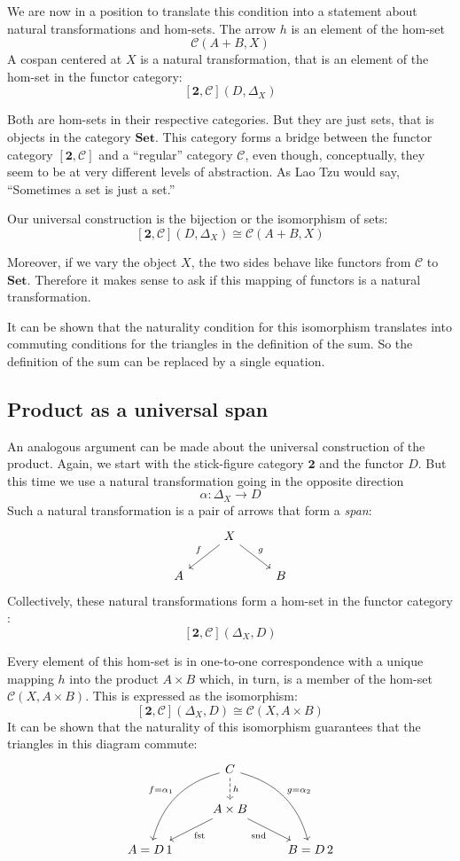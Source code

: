 \documentclass[DaoFP]{subfiles}
\begin{document}
We are now in a position to translate this condition into a statement about natural transformations and hom-sets. The arrow $h$ is an element of the hom-set 
\[ \mathcal{C}(A + B, X)\]
A cospan centered at $X$ is a natural transformation, that is an element of the hom-set in the functor category:
\[ [\mathbf{2}, \mathcal{C}](D, \Delta_X) \]

Both are hom-sets in their respective categories. But they are just sets, that is objects in the category $\mathbf{Set}$. This category forms a bridge between the functor category $[\mathbf{2}, \mathcal{C}]$ and a ``regular'' category $\mathcal{C}$, even though, conceptually, they seem to be at very different levels of abstraction. As Lao Tzu would say, ``Sometimes a set is just a set.''

Our universal construction is the bijection or the isomorphism of sets:
\[ [\mathbf{2}, \mathcal{C}](D, \Delta_X)  \cong \mathcal{C}(A + B, X) \]

Moreover, if we vary the object $X$, the two sides behave like functors from  $\mathcal{C}$ to $\mathbf{Set}$. Therefore it makes sense to ask if this mapping of functors is a natural transformation. 

It can be shown that the naturality condition for this isomorphism translates into commuting conditions for the triangles in the definition of the sum. So the definition of the sum can be replaced by a single equation.

\subsection{Product as a universal span}

An analogous argument can be made about the universal construction of the product. Again, we start with the stick-figure category $\mathbf{2}$ and the functor $D$. But this time we use a natural transformation going in the opposite direction
\[ \alpha \colon \Delta_X \to D \]
Such a natural transformation is a pair of arrows that form a \emph{span}:
\[
 \begin{tikzcd}
 &X
 \arrow[dl, "f"']
 \arrow[dr, "g"]
 \\
 A
 && B
  \end{tikzcd}
\]
Collectively, these natural transformations form a hom-set in the functor category :
\[[\mathbf{2}, \mathcal{C}](\Delta_X, D) \]

Every element of this hom-set is in one-to-one correspondence with a unique mapping $h$ into the product $A \times B$ which, in turn, is a member of the hom-set $\mathcal{C}(X, A \times B)$. This is expressed as the isomorphism:
\[ [\mathbf{2}, \mathcal{C}](\Delta_X, D)  \cong \mathcal{C}(X, A \times B) \]
It can be shown that the naturality of this isomorphism guarantees that the triangles in this diagram commute:
\[
 \begin{tikzcd}
 & C 
\arrow[d, dashed, "h"]
 \arrow[ddl, bend right, "f = \alpha_1"']
 \arrow[ddr, bend left, "g = \alpha_2"]
\\
&A \times B
 \arrow[dl,  "\text{fst}"]
  \arrow[dr,   "\text{snd}"']
\\
A = D\, 1 && B = D \, 2
 \end{tikzcd}
\]
\end{document}
